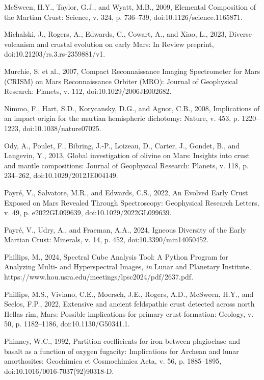 \documentclass[11pt]{article}
\begin{document}
\begin{thebibliography}{99}
 McSween, H.Y., Taylor, G.J., and Wyatt, M.B., 2009, Elemental Composition of the Martian Crust: Science, v. 324, p. 736--739, doi:10.1126/science.1165871.

 Michalski, J., Rogers, A., Edwards, C., Cowart, A., and Xiao, L., 2023, Diverse volcanism and crustal evolution on early Mars: In Review preprint, doi:10.21203/rs.3.rs-2359881/v1.

 Murchie, S. et al., 2007, Compact Reconnaissance Imaging Spectrometer for Mars (CRISM) on Mars Reconnaissance Orbiter (MRO): Journal of Geophysical Research: Planets, v. 112, doi:10.1029/2006JE002682.

 Nimmo, F., Hart, S.D., Korycansky, D.G., and Agnor, C.B., 2008, Implications of an impact origin for the martian hemispheric dichotomy: Nature, v. 453, p. 1220--1223, doi:10.1038/nature07025.

 Ody, A., Poulet, F., Bibring, J.-P., Loizeau, D., Carter, J., Gondet, B., and Langevin, Y., 2013, Global investigation of olivine on Mars: Insights into crust and mantle compositions: Journal of Geophysical Research: Planets, v. 118, p. 234--262, doi:10.1029/2012JE004149.

 Payré, V., Salvatore, M.R., and Edwards, C.S., 2022, An Evolved Early Crust Exposed on Mars Revealed Through Spectroscopy: Geophysical Research Letters, v. 49, p. e2022GL099639, doi:10.1029/2022GL099639.

 Payré, V., Udry, A., and Fraeman, A.A., 2024, Igneous Diversity of the Early Martian Crust: Minerals, v. 14, p. 452, doi:10.3390/min14050452.

 Phillips, M., 2024, Spectral Cube Analysis Tool: A Python Program for Analyzing Multi- and Hyperspectral Images, \textit{in} Lunar and Planetary Institute, https://www.hou.usra.edu/meetings/lpsc2024/pdf/2637.pdf.

 Phillips, M.S., Viviano, C.E., Moersch, J.E., Rogers, A.D., McSween, H.Y., and Seelos, F.P., 2022, Extensive and ancient feldspathic crust detected across north Hellas rim, Mars: Possible implications for primary crust formation: Geology, v. 50, p. 1182--1186, doi:10.1130/G50341.1.

 Phinney, W.C., 1992, Partition coefficients for iron between plagioclase and basalt as a function of oxygen fugacity: Implications for Archean and lunar anorthosites: Geochimica et Cosmochimica Acta, v. 56, p. 1885--1895, doi:10.1016/0016-7037(92)90318-D.


\end{thebibliography}
\end{document}
